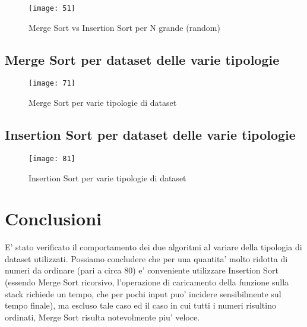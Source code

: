 \documentclass[a4paper]{article}
\begin{document}
		\begin{figure}[!htb]
		\centering
		\texttt{[image: 51]}
		\caption{Merge Sort vs Insertion Sort per N grande (random)}
		\label{fig:BigInsMergeRandom}
		\end{figure}
\newpage
\subsection{Merge Sort per dataset delle varie tipologie}
		\begin{figure}[!htb]
		\centering
		\texttt{[image: 71]}
		\caption{Merge Sort per varie tipologie di dataset}
		\label{fig:CasiMerge}
		\end{figure}
\subsection{Insertion Sort per dataset delle varie tipologie}
		\begin{figure}[!htb]
		\centering
		\texttt{[image: 81]}
		\caption{Insertion Sort per varie tipologie di dataset}
		\label{fig:CasiInsertion}
		\end{figure}
\section{Conclusioni}
E' stato verificato il comportamento dei due algoritmi al variare della tipologia di dataset utilizzati. Possiamo concludere che per una quantita' molto ridotta di numeri da ordinare (pari a circa 80) e' conveniente utilizzare Insertion Sort (essendo Merge Sort ricorsivo, l'operazione di caricamento della funzione sulla stack richiede un tempo, che per pochi input puo' incidere sensibilmente sul tempo finale), ma escluso tale caso ed il caso in cui tutti i numeri risultino ordinati, Merge Sort risulta notevolmente piu' veloce.
\end{document}

